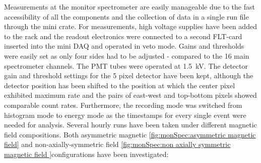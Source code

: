   Measurements at the monitor spectrometer are easily manageable due to the fast accessibility of all the components and the collection of data in a single run file through the mini crate.
  For measurements, high voltage supplies have been added to the  rack and the readout electronics were connected to a second FLT-card inserted into the mini DAQ and operated in veto mode. Gains and thresholds were easily set as only four sides had to be adjusted - compared to the 16 main spectrometer channels. The PMT tubes were operated at \SI{1.5}{\kilo\volt}. The detector gain and threshold settings for the 5 pixel detector have been kept, although the detector position has been shifted to the position at which the center pixel exhibited maximum rate and the pairs of east-west and top-bottom pixels showed comparable count rates. Furthermore, the recording mode was switched from histogram mode to energy mode as the timestamps for every single event were needed for analysis. 
  Several hourly runs have been taken under different magnetic field compositions. Both asymmetric magnetic \ref{fig:monSpec:asymmetric magnetic field} and non-axially-symmetric field \ref{fig:monSpec:non axially symmetric magnetic field }configurations have been investigated: \todo{}
